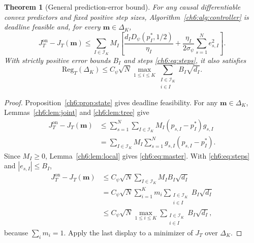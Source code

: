 \documentclass[11pt]{article}
\newcommand{\Reg}{\mathrm{Reg}}
\theoremstyle{plain}
\newtheorem{Thm:Theorem}{Theorem}[section]
\theoremstyle{remark}
\numberwithin{equation}{section}
\begin{document}
\begin{Thm:Theorem}[General prediction-error bound]\label{ch6:thm:master}
For any causal differentiable convex predictors and fixed positive step sizes,
Algorithm~\ref{ch6:alg:controller} is deadline feasible and, for every $\mathbf m\in\Delta_K$,
\begin{equation}\label{ch6:eq:master}
 \boxed{J_T^{\mathrm{on}}-J_T(\mathbf m)\le
 \sum_{I\in\mathcal{I}_K}M_I\left[
 \frac{d_I{D_\psi}(p_I^*,1/2)}{\eta_I}
 +\frac{\eta_I}{2\sigma_\psi}\sum_{s=1}^Ne_{s,I}^2\right].}
\end{equation}
With strictly positive error bounds $B_I$ and steps \eqref{ch6:eq:steps}, it also satisfies
\begin{equation}\label{ch6:eq:path}
 \Reg_T(\Delta_K)\le{C_\psi}\sqrt N
 \max_{1\le i\le K}\sum_{\substack{I\in\mathcal{I}_K\\i\in I}}B_I\sqrt{d_I}.
\end{equation}
\end{Thm:Theorem}
\begin{proof}
Proposition~\ref{ch6:prop:state} gives deadline feasibility.  For any
$\mathbf m\in\Delta_K$, Lemmas~\ref{ch6:lem:joint} and
\ref{ch6:lem:tree} give
\begin{align*}
J_T^{\mathrm{on}}-J_T(\mathbf m)
&\le\sum_{s=1}^{N}\sum_{I\in\mathcal I_K}
 M_I(p_{s,I}-p_I^*)g_{s,I}\\
&=\sum_{I\in\mathcal I_K}M_I
 \sum_{s=1}^{N}g_{s,I}(p_{s,I}-p_I^*).
\end{align*}
Since $M_I\ge0$, Lemma~\ref{ch6:lem:local} gives \eqref{ch6:eq:master}.
With \eqref{ch6:eq:steps} and $|e_{s,I}|\le B_I$,
\begin{align*}
J_T^{\mathrm{on}}-J_T(\mathbf m)
&\le C_\psi\sqrt N\sum_{I\in\mathcal I_K}
 M_IB_I\sqrt{d_I}\\
&=C_\psi\sqrt N\sum_{i=1}^{K}m_i
 \sum_{\substack{I\in\mathcal I_K\\i\in I}}B_I\sqrt{d_I}\\
&\le C_\psi\sqrt N
 \max_{1\le i\le K}\sum_{\substack{I\in\mathcal I_K\\i\in I}}
 B_I\sqrt{d_I},
\end{align*}
because $\sum_i m_i=1$.  Apply the last display to a minimizer of
$J_T$ over $\Delta_K$.
\end{proof}
\end{document}
